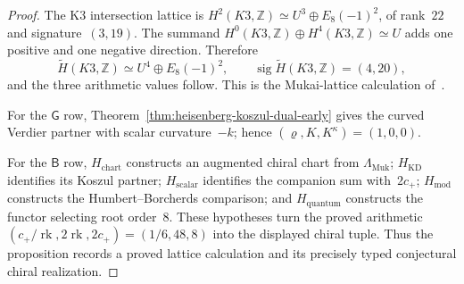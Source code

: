 \begin{proof}
The K3 intersection lattice is
$H^2(K3,\mathbb Z)\simeq U^3\oplus E_8(-1)^2$, of rank~$22$ and
signature~$(3,19)$.  The summand
$H^0(K3,\mathbb Z)\oplus H^4(K3,\mathbb Z)\simeq U$ adds one positive
and one negative direction.  Therefore
\[
 \widetilde H(K3,\mathbb Z)
 \simeq U^4\oplus E_8(-1)^2,
 \qquad
 \operatorname{sig}\widetilde H(K3,\mathbb Z)=(4,20),
\]
and the three arithmetic values follow.  This is the Mukai-lattice
calculation of~\cite{Mukai1987}.

For the $\mathsf G$ row,
Theorem~\ref{thm:heisenberg-koszul-dual-early} gives the curved
Verdier partner with scalar curvature~$-k$; hence
$(\varrho,K,K^\kappa)=(1,0,0)$.

For the $\mathsf B$ row, $H_{\mathrm{chart}}$ constructs an augmented
chiral chart from $\Lambda_{\mathrm{Muk}}$;
$H_{\mathrm{KD}}$ identifies its Koszul partner;
$H_{\mathrm{scalar}}$ identifies the companion sum with~$2c_+$;
$H_{\mathrm{mod}}$ constructs the Humbert--Borcherds comparison; and
$H_{\mathrm{quantum}}$ constructs the functor selecting root order~$8$.
These hypotheses turn the proved arithmetic
$(c_+/\operatorname{rk},2\operatorname{rk},2c_+)
=(1/6,48,8)$ into the displayed chiral tuple.  Thus the proposition
records a proved lattice calculation and its precisely typed
conjectural chiral realization.
\end{proof}

